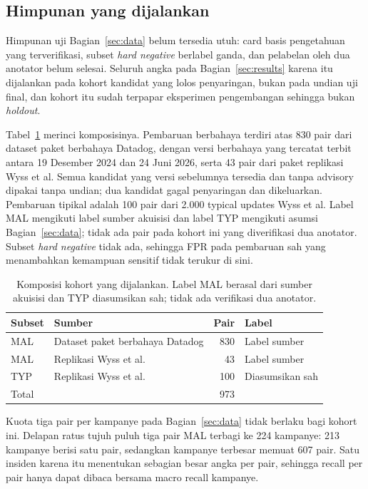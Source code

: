 \documentclass[a4paper,fleqn]{cas-dc}
\begin{document}
\subsection{Himpunan yang dijalankan}\label{sec:run-cohort}

Himpunan uji Bagian~\ref{sec:data} belum tersedia utuh: card basis pengetahuan
yang terverifikasi, subset \emph{hard negative} berlabel ganda, dan pelabelan
oleh dua anotator belum selesai. Seluruh angka pada Bagian~\ref{sec:results}
karena itu dijalankan pada kohort kandidat yang lolos penyaringan, bukan pada
undian uji final, dan kohort itu sudah terpapar eksperimen pengembangan
sehingga bukan \emph{holdout}.

Tabel~\ref{tab:run-cohort} merinci komposisinya. Pembaruan berbahaya terdiri
atas 830 pair dari dataset paket berbahaya Datadog, dengan versi berbahaya
yang tercatat terbit antara 19 Desember 2024 dan 24 Juni 2026, serta 43 pair
dari paket replikasi Wyss et al. Semua kandidat yang versi sebelumnya tersedia
dan tanpa advisory dipakai tanpa undian; dua kandidat gagal penyaringan dan
dikeluarkan. Pembaruan tipikal adalah 100 pair dari 2.000 typical updates Wyss
et al. Label MAL mengikuti label sumber akuisisi dan label TYP mengikuti
asumsi Bagian~\ref{sec:data}; tidak ada pair pada kohort ini yang diverifikasi
dua anotator. Subset \emph{hard negative} tidak ada, sehingga FPR pada
pembaruan sah yang menambahkan kemampuan sensitif tidak terukur di sini.

\begin{table}[t]
\caption{Komposisi kohort yang dijalankan. Label MAL berasal dari sumber
akuisisi dan TYP diasumsikan sah; tidak ada verifikasi dua anotator.}
\label{tab:run-cohort}
\small
\begin{tabular}{p{1.2cm} p{2.6cm} r p{2.2cm}}
\hline
Subset & Sumber & Pair & Label \\
\hline
MAL & Dataset paket berbahaya Datadog & 830 & Label sumber \\
MAL & Replikasi Wyss et al. & 43 & Label sumber \\
TYP & Replikasi Wyss et al. & 100 & Diasumsikan sah \\
\hline
Total & & 973 & \\
\hline
\end{tabular}
\end{table}

Kuota tiga pair per kampanye pada Bagian~\ref{sec:data} tidak berlaku bagi
kohort ini. Delapan ratus tujuh puluh tiga pair MAL terbagi ke 224 kampanye:
213 kampanye berisi satu pair, sedangkan kampanye terbesar memuat 607 pair.
Satu insiden karena itu menentukan sebagian besar angka per pair, sehingga
recall per pair hanya dapat dibaca bersama macro recall kampanye.
\end{document}
